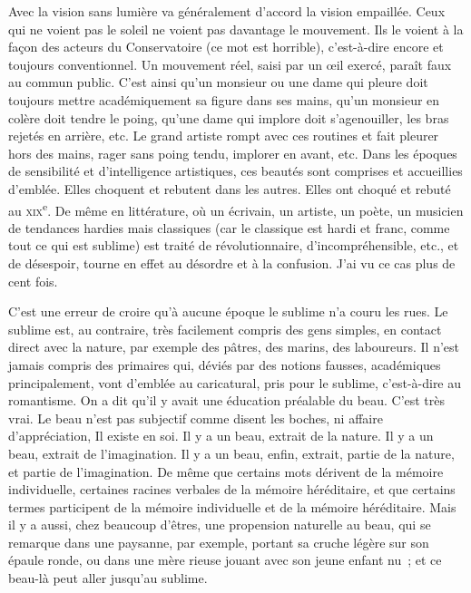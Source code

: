 \documentclass[french,twoside]{book} %
\begin{document}
Avec la vision sans lumière va généralement d’accord la vision empaillée. Ceux qui ne voient pas le soleil ne voient pas davantage le mouvement. Ils le voient à la façon des acteurs du Conservatoire (ce mot est horrible), c’est-à-dire encore et toujours conventionnel. Un mouvement réel, saisi par un œil exercé, paraît faux au commun public. C’est ainsi qu’un monsieur ou une dame qui pleure doit toujours mettre académiquement sa figure dans ses mains, qu’un monsieur en colère doit tendre le poing, qu’une dame qui implore doit s’agenouiller, les bras rejetés en arrière, etc. Le grand artiste rompt avec ces routines et fait pleurer hors des mains, rager sans poing tendu, implorer en avant, etc. Dans les époques de sensibilité et d’intelligence artistiques, ces beautés sont comprises et accueillies d’emblée. Elles choquent et rebutent dans les autres. Elles ont choqué et rebuté au \textsc{xix}\textsuperscript{e}. De même en littérature, où un écrivain, un artiste, un poète, un musicien de tendances hardies mais classiques (car le classique est hardi et franc, comme tout ce qui est sublime) est traité de révolutionnaire, d’incompréhensible, etc., et de désespoir, tourne en effet au désordre et à la confusion. J’ai vu ce cas plus de cent fois.\par
C’est une erreur de croire qu’à aucune époque le sublime n’a couru les rues. Le sublime est, au contraire, très facilement compris des gens simples, en contact direct avec la nature, par exemple des pâtres, des marins, des laboureurs. Il n’est jamais compris des primaires qui, déviés par des notions fausses, académiques principalement, vont d’emblée au caricatural, pris pour le sublime, c’est-à-dire au romantisme. On a dit qu’il y avait une éducation préalable du beau. C’est très vrai. Le beau n’est pas subjectif comme disent les boches, ni affaire d’appréciation, Il existe en soi. Il y a un beau, extrait de la nature. Il y a un beau, extrait de l’imagination. Il y a un beau, enfin, extrait, partie de la nature, et partie de l’imagination. De même que certains mots dérivent de la mémoire individuelle, certaines racines verbales de la mémoire héréditaire, et que certains termes participent de la mémoire individuelle et de la mémoire héréditaire. Mais il y a aussi, chez beaucoup d’êtres, une propension naturelle au beau, qui se remarque dans une paysanne, par exemple, portant sa cruche légère sur son épaule ronde, ou dans une mère rieuse jouant avec son jeune enfant nu ; et ce beau-là peut aller jusqu’au sublime.\par
\end{document}

